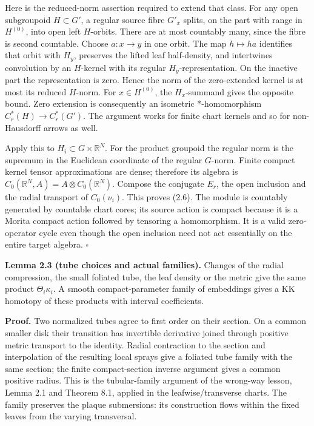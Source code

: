 \documentclass[
  11pt,
]{article}
\begin{document}
Here is the reduced-norm assertion required to extend that class. For
any open subgroupoid \(H\subset G'\), a regular source fibre \(G'_x\)
splits, on the part with range in \(H^{(0)}\), into open left
\(H\)-orbits. There are at most countably many, since the fibre is
second countable. Choose \(a:x\to y\) in one orbit. The map
\(h\mapsto ha\) identifies that orbit with \(H_y\), preserves the lifted
leaf half-density, and intertwines convolution by an \(H\)-kernel with
its regular \(H_y\)-representation. On the inactive part the
representation is zero. Hence the norm of the zero-extended kernel is at
most its reduced \(H\)-norm. For \(x\in H^{(0)}\), the \(H_x\)-summand
gives the opposite bound. Zero extension is consequently an isometric
*-homomorphism \(C_r^*(H)\to C_r^*(G')\). The argument works for finite
chart kernels and so for non-Hausdorff arrows as well.

Apply this to \(H_i\subset G\times\mathbb R^N\). For the product
groupoid the regular norm is the supremum in the Euclidean coordinate of
the regular \(G\)-norm. Finite compact kernel tensor approximations are
dense; therefore its algebra is
\(C_0(\mathbb R^N,A)=A\otimes C_0(\mathbb R^N)\). Compose the conjugate
\(E_r\), the open inclusion and the radial transport of \(C_0(\nu_i)\).
This proves (2.6). The module is countably generated by countable chart
cores; its source action is compact because it is a Morita compact
action followed by tensoring a homomorphism. It is a valid zero-operator
cycle even though the open inclusion need not act essentially on the
entire target algebra. \(\square\)

\textbf{Lemma 2.3 (tube choices and actual families).} Changes of the
radial compression, the small foliated tube, the leaf density or the
metric give the same product \(\Theta_i\kappa_i\). A smooth
compact-parameter family of embeddings gives a KK homotopy of these
products with interval coefficients.

\textbf{Proof.} Two normalized tubes agree to first order on their
section. On a common smaller disk their transition has invertible
derivative joined through positive metric transport to the identity.
Radial contraction to the section and interpolation of the resulting
local sprays give a foliated tube family with the same section; the
finite compact-section inverse argument gives a common positive radius.
This is the tubular-family argument of the wrong-way lesson, Lemma 2.1
and Theorem 8.1, applied in the leafwise/transverse charts. The family
preserves the plaque submersions: its construction flows within the
fixed leaves from the varying transversal.
\end{document}
